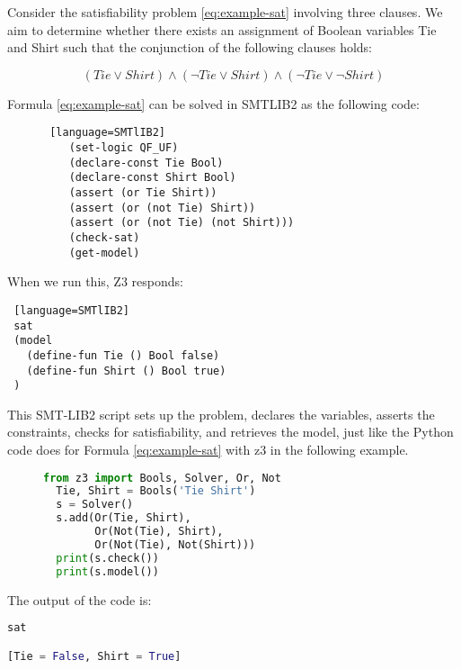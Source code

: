 \documentclass[]{rptuseminar}
\begin{document}
\vspace{1em}

Consider the satisfiability problem \ref{eq:example-sat} involving three clauses. 
We aim to determine whether there exists an assignment of Boolean variables Tie and Shirt such that the conjunction of the following clauses holds:

\begin{equation}
  \label{eq:example-sat}
  (Tie \lor Shirt) \land (\lnot Tie \lor Shirt) \land (\lnot Tie \lor \lnot Shirt)
\end{equation}

Formula \ref{eq:example-sat}  can be solved in SMTLIB2 as the following code:

\begin{figure}[ht]
  \begin{lstlisting} [language=SMTlIB2]
    (set-logic QF_UF)
    (declare-const Tie Bool)
    (declare-const Shirt Bool)
    (assert (or Tie Shirt))
    (assert (or (not Tie) Shirt))
    (assert (or (not Tie) (not Shirt)))
    (check-sat)
    (get-model)
  \end{lstlisting}
  \end{figure}

  When we run this, Z3 responds:
\begin{lstlisting} [language=SMTlIB2]
 sat
 (model
   (define-fun Tie () Bool false)
   (define-fun Shirt () Bool true)
 )
\end{lstlisting}
\vspace{1em}

  This SMT-LIB2 script sets up the problem, declares the variables, asserts the constraints, checks for satisfiability, and retrieves the model, just like the Python code does for Formula \ref{eq:example-sat}  with z3 in the following example.

\begin{figure}[ht]
\begin{lstlisting}[language=Python]
  from z3 import Bools, Solver, Or, Not
  Tie, Shirt = Bools('Tie Shirt')
  s = Solver()
  s.add(Or(Tie, Shirt),
        Or(Not(Tie), Shirt),
        Or(Not(Tie), Not(Shirt)))
  print(s.check())
  print(s.model())
\end{lstlisting}
\end{figure}

\vspace{1em}
The output of the code is:
\begin{lstlisting}[language=Python]
sat

[Tie = False, Shirt = True]
\end{lstlisting}
\vspace{1em}
\end{document}
